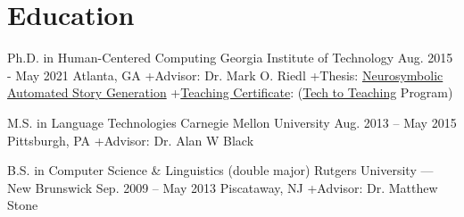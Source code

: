 \section*{{} Education}

\vspace{-6pt}
\begin{cventries}

  \cventry
    {Ph.D. in Human-Centered Computing} %
    {Georgia Institute of Technology} %
    {Aug. 2015 - May 2021} %
    {Atlanta, GA} %
    {
        \hspace{5mm}+\hspace{2mm}Advisor: Dr. Mark O. Riedl\newline%
        \vspace{.1mm}\hspace{4.7mm}+\hspace{2mm}Thesis: \href{https://smartech.gatech.edu/handle/1853/64643}{Neurosymbolic Automated Story Generation}\newline%
        \hspace{4.7mm}+\hspace{2mm}\href{https://laramartin.net/assets/img/teaching-certificate.pdf}{Teaching Certificate}: (\href{https://ctl.gatech.edu/tech-teaching}{Tech to Teaching} Program)
    }



 \cventry
    {M.S. in Language Technologies} %
    {Carnegie Mellon University} %
    {Aug. 2013 – May 2015} %
    {Pittsburgh, PA} %
    {\hspace{5mm}+\hspace{2mm}Advisor: Dr. Alan W Black}


  \cventry
    {B.S. in Computer Science \& Linguistics (double major)} %
    {Rutgers University --- New Brunswick} %
    {Sep. 2009 – May 2013} %
    {Piscataway, NJ} %
    {      
      \hspace{5mm}+\hspace{2mm}Advisor: Dr. Matthew Stone
    }%

\end{cventries}
